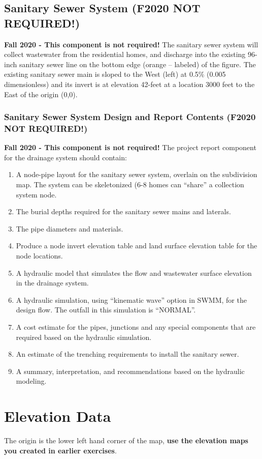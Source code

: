 \documentclass[12pt]{article}
\begin{document}
\subsection{\small{Sanitary Sewer System (F2020 NOT REQUIRED!)}}
\textbf{Fall 2020 - This component is not required!}
The sanitary sewer system will collect wastewater from the residential homes, and discharge into the existing 96-inch sanitary sewer line on the bottom edge (orange -- labeled)  of the figure.
The existing sanitary sewer main is sloped to the West (left) at 0.5\% (0.005 dimensionless) and its invert is at elevation 42-feet at a location 3000 feet to the East of the origin (0,0).

\subsubsection{\small{Sanitary Sewer System Design and Report Contents (F2020 NOT REQUIRED!)}}
\textbf{Fall 2020 - This component is not required!}
The project report component for the drainage system should contain:
\begin{enumerate}
\item A node-pipe layout for the sanitary sewer system, overlain on the subdivision map.  The system can be skeletonized (6-8 homes can ``share'' a collection system node.
\item The burial depths required for the sanitary sewer mains and laterals.
\item The pipe diameters and materials.
\item Produce a node invert elevation table and land surface elevation table for the node locations.
\item A hydraulic model that simulates the flow and wastewater surface elevation in the drainage system.   
\item A hydraulic simulation, using ``kinematic wave'' option in SWMM, for the design flow.  The outfall in this simulation is ``NORMAL''. 
\item A cost estimate for the pipes, junctions and any special components that are required based on the hydraulic simulation.   
\item An estimate of the trenching requirements to install the sanitary sewer.
\item A summary, interpretation, and recommendations based on the hydraulic modeling.
\end{enumerate}

\newpage
\section{\small{Elevation Data}}
The origin is the lower left hand corner of the map, \textbf{use the elevation maps you created in earlier exercises}.
\end{document}
